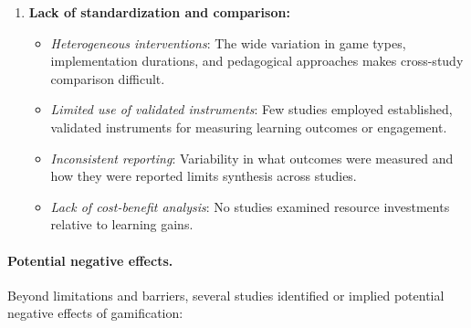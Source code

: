 \documentclass[a4paper,fleqn]{cas-sc}
\begin{document}
\begin{enumerate}[noitemsep]
	\item 
\textbf{Lack of standardization and comparison:}

\begin{itemize}[noitemsep]
 \item \textit{Heterogeneous interventions}: The wide variation in game types, implementation durations, and pedagogical approaches makes cross-study comparison difficult.
 
 \item \textit{Limited use of validated instruments}: Few studies employed established, validated instruments for measuring learning outcomes or engagement.
 
 \item \textit{Inconsistent reporting}: Variability in what outcomes were measured and how they were reported limits synthesis across studies.
 
 \item \textit{Lack of cost-benefit analysis}: No studies examined resource investments relative to learning gains.
\end{itemize}
\end{enumerate}



\paragraph{Potential negative effects.}

Beyond limitations and barriers, several studies identified or implied potential negative effects of gamification:
\end{document}
